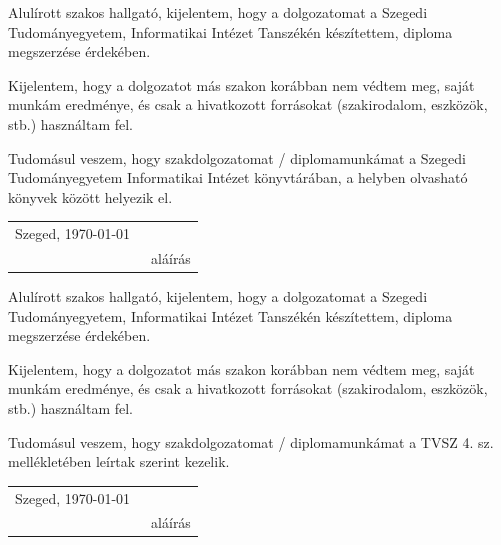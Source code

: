 \documentclass[12pt]{report}
\theoremstyle{definition}
\begin{document}

\noindent
Alulírott \makebox[4cm]{\dotfill} szakos hallgató, kijelentem, hogy a dolgozatomat a Szegedi Tudományegyetem, Informatikai Intézet \makebox[4cm]{\dotfill} Tanszékén készítettem, \makebox[4cm]{\dotfill} diploma megszerzése érdekében.

Kijelentem, hogy a dolgozatot más szakon korábban nem védtem meg, saját munkám eredménye, és csak a hivatkozott forrásokat (szakirodalom, eszközök, stb.) használtam fel.

Tudomásul veszem, hogy szakdolgozatomat / diplomamunkámat a Szegedi Tudományegyetem Informatikai Intézet könyvtárában, a helyben olvasható könyvek között helyezik el.

\vspace*{2cm}

\begin{tabular}{lc}
	Szeged, \today\
	\hspace{2cm} & \makebox[6cm]{\dotfill} \\
	             & aláírás                 \\
\end{tabular}


\vspace*{4cm}


\noindent
Alulírott \makebox[4cm]{\dotfill} szakos hallgató, kijelentem, hogy a dolgozatomat a Szegedi Tudományegyetem, Informatikai Intézet \makebox[4cm]{\dotfill} Tanszékén készítettem, \makebox[4cm]{\dotfill} diploma megszerzése érdekében.

Kijelentem, hogy a dolgozatot más szakon korábban nem védtem meg, saját munkám eredménye, és csak a hivatkozott forrásokat (szakirodalom, eszközök, stb.) használtam fel.

Tudomásul veszem, hogy szakdolgozatomat / diplomamunkámat a TVSZ 4. sz. mellékletében leírtak szerint kezelik.

\vspace*{2cm}

\begin{tabular}{lc}
	Szeged, \today\
	\hspace{2cm} & \makebox[6cm]{\dotfill} \\
	             & aláírás                 \\
\end{tabular}
\end{document}
